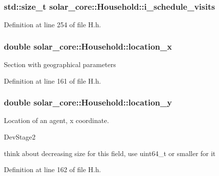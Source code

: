 \subsubsection[{i\+\_\+schedule\+\_\+visits}]{\setlength{\rightskip}{0pt plus 5cm}std\+::size\+\_\+t solar\+\_\+core\+::\+Household\+::i\+\_\+schedule\+\_\+visits\hspace{0.3cm}{\ttfamily [protected]}}\label{classsolar__core_1_1_household_a077c668f06c009a43c535f1ad92cf92e}


Definition at line 254 of file H.\+h.

\hypertarget{classsolar__core_1_1_household_a6596375631a366fdd24270f75548841f}{}
\subsubsection[{location\+\_\+x}]{\setlength{\rightskip}{0pt plus 5cm}double solar\+\_\+core\+::\+Household\+::location\+\_\+x}\label{classsolar__core_1_1_household_a6596375631a366fdd24270f75548841f}
Section with geographical parameters 

Definition at line 161 of file H.\+h.

\hypertarget{classsolar__core_1_1_household_a1ba6b7af82982096e05d99a70a2647eb}{}
\subsubsection[{location\+\_\+y}]{\setlength{\rightskip}{0pt plus 5cm}double solar\+\_\+core\+::\+Household\+::location\+\_\+y}\label{classsolar__core_1_1_household_a1ba6b7af82982096e05d99a70a2647eb}
Location of an agent, x coordinate.\begin{DoxyRefDesc}{Dev\+Stage2}
\item[\hyperlink{_dev_stage2__DevStage2000011}{Dev\+Stage2}]think about decreasing size for this field, use uint64\+\_\+t or smaller for it \end{DoxyRefDesc}


Definition at line 162 of file H.\+h.

\hypertarget{classsolar__core_1_1_household_a3ee8b2654cad46236d11f85a4ccd9574}{}
